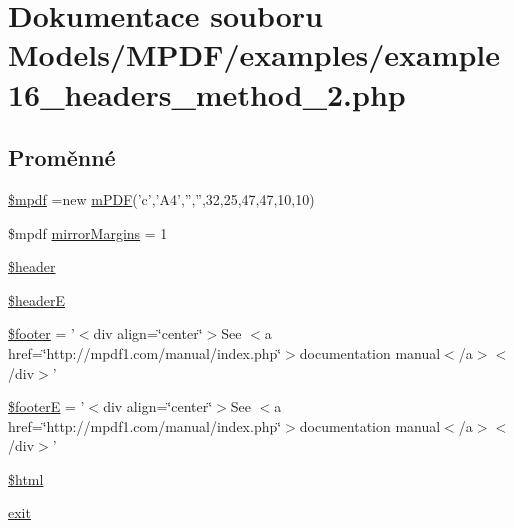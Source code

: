 \hypertarget{example16__headers__method__2_8php}{\section{Dokumentace souboru Models/\-M\-P\-D\-F/examples/example16\-\_\-headers\-\_\-method\-\_\-2.php}
\label{example16__headers__method__2_8php}
}
\subsection*{Proměnné}
\begin{DoxyCompactItemize}
\item 
\hyperlink{example16__headers__method__2_8php_ad028f81910d6cbab9b184d2214b3a8f8}{\$mpdf} =new \hyperlink{classm_p_d_f}{m\-P\-D\-F}('c','A4','','',32,25,47,47,10,10)
\item 
\$mpdf \hyperlink{example16__headers__method__2_8php_a24c284cb7774410f65953584ea1fd9c1}{mirror\-Margins} = 1
\item 
\hyperlink{example16__headers__method__2_8php_a4f44601f2b9dc8a1644bce53c94ce622}{\$header}
\item 
\hyperlink{example16__headers__method__2_8php_a9fd8be48f713e8db03fa5cee78485f2e}{\$header\-E}
\item 
\hyperlink{example16__headers__method__2_8php_abaa4216c852c51c380dd8f10d3cfe944}{\$footer} = '$<$div align=\char`\"{}center\char`\"{}$>$See $<$a href=\char`\"{}http\-://mpdf1.\-com/manual/index.\-php\char`\"{}$>$documentation manual$<$/a$>$$<$/div$>$'
\item 
\hyperlink{example16__headers__method__2_8php_a11a5e15badebbec27b59acdf150c2a63}{\$footer\-E} = '$<$div align=\char`\"{}center\char`\"{}$>$See $<$a href=\char`\"{}http\-://mpdf1.\-com/manual/index.\-php\char`\"{}$>$documentation manual$<$/a$>$$<$/div$>$'
\item 
\hyperlink{example16__headers__method__2_8php_a6f96e7fc92441776c9d1cd3386663b40}{\$html}
\item 
\hyperlink{example16__headers__method__2_8php_a6733eb5f605d09eaede9845835d71c4e}{exit}
\end{DoxyCompactItemize}


